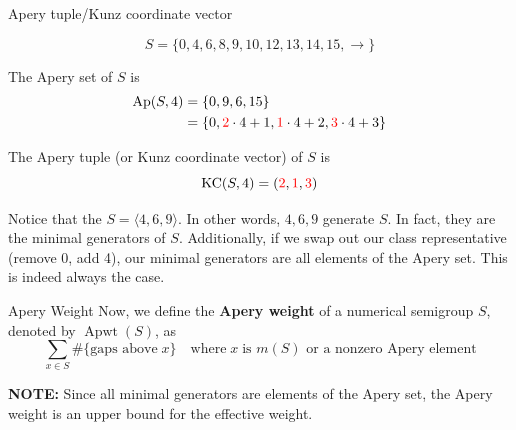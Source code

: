 \documentclass{beamer}
\DeclareMathOperator{\Ap}{Ap}
\DeclareMathOperator{\KC}{KC}
\DeclareMathOperator{\Apwt}{Apwt}
\begin{document}
\begin{frame}{Apery tuple/Kunz coordinate vector}

\[S=\{0,4,6,8,9,10,12,13,14,15,\to\}\]
\begin{center}
\end{center}

    The Apery set of $S$ is 
    \begin{align*}
        \Ap(S,4)&=\{0,9,6,15\}\\
                &=\{0,\textcolor{red}{2}\cdot 4+1,\textcolor{red}{1}\cdot 4+2,\textcolor{red}{3}\cdot 4+3\}
    \end{align*}

    The Apery tuple (or Kunz coordinate vector) of $S$ is 
    \[\KC(S,4)=(\textcolor{red}{2},\textcolor{red}{1},\textcolor{red}{3})\]
    
\end{frame}

\begin{frame}
    Notice that the $S=\langle 4,6,9\rangle$. In other words, $4,6,9$ generate $S$. In fact, they are the minimal generators of $S$. Additionally, if we swap out our class representative (remove 0, add 4), our minimal generators are all elements of the Apery set. This is indeed always the case.
\end{frame}

\begin{frame}{Apery Weight}
    Now, we define the \textbf{Apery weight} of a numerical semigroup $S$, denoted by $\Apwt(S)$, as
    \[\sum_{x\in S} \#\{\text{gaps above}\; x\}\quad\text{where}\; x\;\text{is $m(S)$ or a nonzero Apery element}\]
    \vspace{1cm}
    
    \textbf{NOTE:} Since all minimal generators are elements of the Apery set, the Apery weight is an upper bound for the effective weight.
\end{frame}
\end{document}
